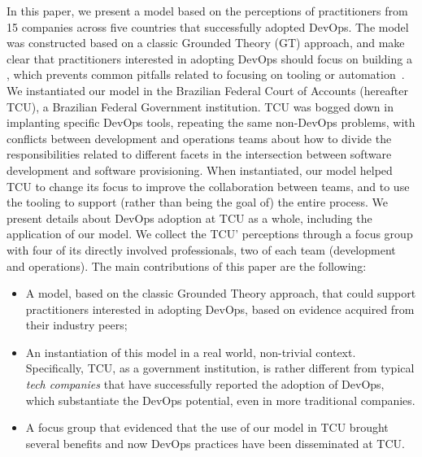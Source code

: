 In this paper, we present a model based on the perceptions of practitioners from
15 companies across five countries that successfully adopted DevOps. The model
was constructed based on a classic Grounded Theory (GT) approach,
and make clear that practitioners interested in adopting DevOps should focus on building a
\cc, which prevents common pitfalls related to focusing on tooling or automation~\cite{Kromhout:2017:Queue}.
We instantiated our model in the Brazilian Federal Court of
Accounts (hereafter TCU), a Brazilian Federal Government institution. TCU was
bogged down in implanting specific DevOps tools, repeating the same non-DevOps
problems, with conflicts between development and operations teams about how to
divide the responsibilities related to different facets in the intersection
between software development and software provisioning. When instantiated,
our model helped TCU to change its focus to improve the collaboration between teams, and to use the tooling
to support (rather than being the goal of) the entire process. We present details
about DevOps adoption at TCU as a whole, including the application of our model.
We collect the TCU' perceptions through a focus group with four of its directly
involved professionals, two of each team (development and operations).
The main contributions of this paper are the following:

\begin{itemize}
\item A model, based on the classic Grounded Theory approach, that could support practitioners interested in adopting DevOps,
      based on evidence acquired from their industry peers;
\item An instantiation of this model in a real world, non-trivial context. Specifically, TCU, as a government institution, is rather different from typical \emph{tech companies} that have successfully reported the adoption of DevOps, which substantiate the DevOps potential, even in more traditional companies.
\item A focus group that evidenced that the use of our model in TCU brought several benefits and
now DevOps practices have been disseminated at TCU.
\end{itemize}
